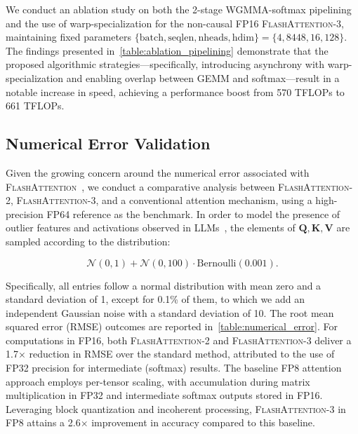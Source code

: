 \begin{algorithm}[H]
\begin{algorithmic}[1]
\begin{itemize}
We conduct an ablation study on both the 2-stage WGMMA-softmax pipelining and the use of warp-specialization for the non-causal FP16 \textsc{FlashAttention-3}, maintaining fixed parameters $\{\text{batch}, \text{seqlen}, \text{nheads}, \text{hdim}\} = \{ 4, 8448, 16, 128\}$. The findings presented in~\cref{table:ablation_pipelining} demonstrate that the proposed algorithmic strategies—specifically, introducing asynchrony with warp-specialization and enabling overlap between GEMM and softmax—result in a notable increase in speed, achieving a performance boost from 570 TFLOPs to 661 TFLOPs.

\subsection{Numerical Error Validation}
\label{sec:numerical_error}

Given the growing concern around the numerical error associated with \textsc{FlashAttention}~\citep{golden2024flash}, we conduct a comparative analysis between \textsc{FlashAttention-2}, \textsc{FlashAttention-3}, and a conventional attention mechanism, using a high-precision FP64 reference as the benchmark. In order to model the presence of outlier features and activations observed in LLMs~\citep{dettmers2208llm, sun2024massive}, the elements of $\mathbf{Q}, \mathbf{K}, \mathbf{V}$ are sampled according to the distribution:

\begin{equation*}
  \mathcal{N}(0, 1) + \mathcal{N}(0, 100) \cdot \mathrm{Bernoulli}(0.001).
\end{equation*}

Specifically, all entries follow a normal distribution with mean zero and a standard deviation of 1, except for 0.1\% of them, to which we add an independent Gaussian noise with a standard deviation of 10. The root mean squared error (RMSE) outcomes are reported in~\cref{table:numerical_error}. For computations in FP16, both \textsc{FlashAttention-2} and \textsc{FlashAttention-3} deliver a 1.7$\times$ reduction in RMSE over the standard method, attributed to the use of FP32 precision for intermediate (softmax) results. The baseline FP8 attention approach employs per-tensor scaling, with accumulation during matrix multiplication in FP32 and intermediate softmax outputs stored in FP16. Leveraging block quantization and incoherent processing, \textsc{FlashAttention-3} in FP8 attains a 2.6$\times$ improvement in accuracy compared to this baseline.


\end{itemize}
\end{algorithmic}
\end{algorithm}
